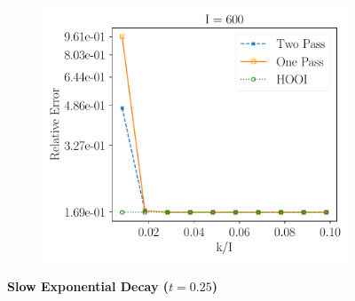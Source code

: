 \begin{figure}[H]
\begin{subfigure}{0.32\textwidth}
    \includegraphics[scale = 0.3]{figure/sed_n600.pdf}
    \end{subfigure}
\textbf{Slow Exponential Decay ($t = 0.25$)} \\ 
\captionsetup{labelformat=empty}
\end{figure}

